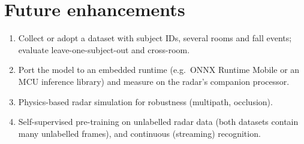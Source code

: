 \section{Future enhancements}
\begin{enumerate}[nosep]
\item Collect or adopt a dataset with subject IDs, several rooms and fall events;
  evaluate leave-one-subject-out and cross-room.
\item Port the model to an embedded runtime (e.g.\ ONNX Runtime Mobile or an
  MCU inference library) and measure on the radar's companion processor.
\item Physics-based radar simulation for robustness (multipath, occlusion).
\item Self-supervised pre-training on unlabelled radar data (both datasets
  contain many unlabelled frames), and continuous (streaming) recognition.
\end{enumerate}
